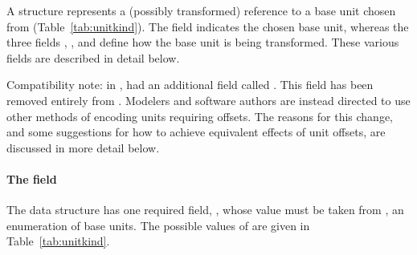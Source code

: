 A \Unit structure represents a (possibly transformed) reference to
a base unit chosen from 
(Table~\ref{tab:unitkind}).  The field  indicates the
chosen base unit, whereas the three fields ,
, and  define how the base unit is
being transformed.  These various fields are described in detail
below.

Compatibility note: in \sbmltwoone, \Unit had an additional field
called .  This field has been removed entirely from
\sbmltwotwo.  Modelers and software authors are instead directed
to use other methods of encoding units requiring offsets.  The
reasons for this change, and some suggestions for how to achieve
equivalent effects of unit offsets, are discussed in more detail
below.


\paragraph{The  field}



The \Unit data structure has one required field, ,
whose value must be taken from , an enumeration
of base units.  The possible values of  are
given in Table~\vref{tab:unitkind}.


